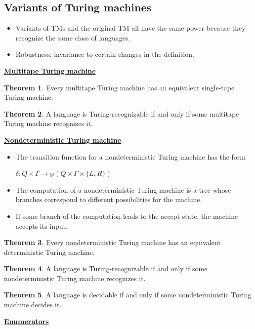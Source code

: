\documentclass[11pt]{article}
\theoremstyle{definition}
\newtheorem{thm}{Theorem}[section]
\begin{document}
\subsection{Variants of Turing machines}
\begin{itemize}[leftmargin=*]
    \item Variants of TMs and the original TM all have the same power because they recognize the same class of languages.
    \item Robustness: invariance to certain changes in the definition.
\end{itemize}
\textbf{\underline{Multitape Turing machine}}
\begin{thm}
    Every multitape Turing machine has an equivalent single-tape Turing machine.
\end{thm}
\begin{thm}
    A language is Turing-recognizable if and only if some multitape Turing machine recognizes it.
\end{thm}
\textbf{\underline{Nondeterministic Turing machine}}
\begin{itemize}[leftmargin=*]
    \item The transition function for a nondeterministic Turing machine has the form
    \begin{center}
        $\delta:Q\times\Gamma\to\wp(Q\times\Gamma\times\{L,R\})$
    \end{center}
    \item The computation of a nondeterministic Turing machine is a tree whose branches correspond to different possibilities for the machine. 
    \item If some branch of the computation leads to the accept state, the machine accepts its input.
\end{itemize}
\begin{thm}
    Every nondeterministic Turing machine has an equivalent deterministic Turing machine.
\end{thm}
\begin{thm}
    A language is Turing-recognizable if and only if some nondeterministic Turing machine recognizes it.
\end{thm}
\begin{thm}
    A language is decidable if and only if some nondeterministic Turing machine
decides it.
\end{thm}
\textbf{\underline{Enumerators}}
\end{document}
